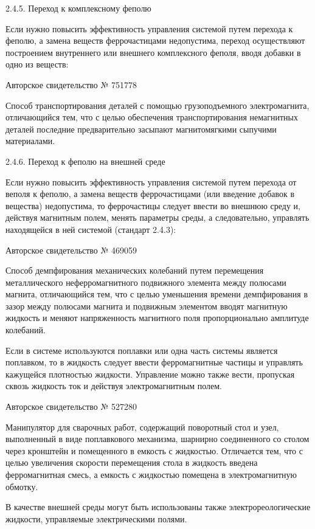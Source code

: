 2.4.5. Переход к комплексному феполю

Если нужно  повысить эффективность управления системой  путем перехода
к  феполю,  а  замена   веществ  феррочастицами  недопустима,  переход
осуществляют построением внутреннего или внешнего комплексного феполя,
вводя добавки в одно из веществ:


Авторское свидетельство № 751778

Способ   транспортирования    деталей   с    помощью   грузоподъемного
электромагнита,   отличающийся   тем,    что   с   целью   обеспечения
транспортирования   немагнитных   деталей   последние   предварительно
засыпают магнитомягкими сыпучими материалами.


2.4.6. Переход к феполю на внешней среде

Если нужно  повысить эффективность управления системой  путем перехода
от  веполя к  феполю, а  замена веществ  феррочастицами (или  введение
добавок  в вещества)  недопустима, то  феррочастицы следует  ввести во
внешнюю среду и,  действуя магнитным полем, менять  параметры среды, а
следовательно, управлять находящейся в ней системой (стандарт 2.4.3):


Авторское свидетельство № 469059

Способ   демпфирования   механических  колебаний   путем   перемещения
металлического  неферромагнитного подвижного  элемента между  полюсами
магнита,   отличающийся   тем,   что  с   целью   уменьшения   времени
демпфирования  в зазор  между полюсами  магнита и  подвижным элементом
вводят  магнитную  жидкость  и меняют  напряженность  магнитного  поля
пропорционально амплитуде колебаний.

Если в системе  используются поплавки или одна  часть системы является
поплавком,  то  в жидкость  следует  ввести  ферромагнитные частицы  и
управлять кажущейся плотностью жидкости. Управление можно также вести,
пропуская сквозь жидкость ток и действуя электромагнитным полем.


Авторское свидетельство № 527280

Манипулятор для  сварочных работ,  содержащий поворотный стол  и узел,
выполненный в  виде поплавкового  механизма, шарнирно  соединенного со
столом через кронштейн и помещенного в емкость с жидкостью. Отличается
тем,  что с  целью увеличения  скорости перемещения  стола в  жидкость
введена  ферромагнитная  смесь,  а  емкость  с  жидкостью  помещена  в
электромагнитную обмотку.

В   качестве    внешней   среды   могут   быть    использованы   также
электрореологические жидкости, управляемые электрическими полями.


